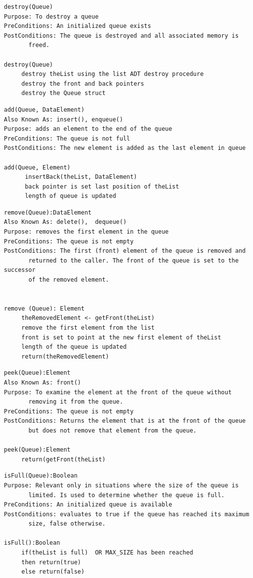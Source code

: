 \begin{lstlisting}
destroy(Queue)
Purpose: To destroy a queue
PreConditions: An initialized queue exists
PostConditions: The queue is destroyed and all associated memory is 
       freed.

destroy(Queue)
     destroy theList using the list ADT destroy procedure
     destroy the front and back pointers
     destroy the Queue struct
\end{lstlisting}

   

\begin{lstlisting}
add(Queue, DataElement)
Also Known As: insert(), enqueue()
Purpose: adds an element to the end of the queue
PreConditions: The queue is not full
PostConditions: The new element is added as the last element in queue

add(Queue, Element)
      insertBack(theList, DataElement)
      back pointer is set last position of theList
      length of queue is updated
\end{lstlisting}


\begin{lstlisting}
remove(Queue):DataElement
Also Known As: delete(),  dequeue()
Purpose: removes the first element in the queue
PreConditions: The queue is not empty
PostConditions: The first (front) element of the queue is removed and 
       returned to the caller. The front of the queue is set to the successor 
       of the removed element.


remove (Queue): Element
     theRemovedElement <- getFront(theList)
     remove the first element from the list
     front is set to point at the new first element of theList
     length of the queue is updated
     return(theRemovedElement)
\end{lstlisting}





\begin{lstlisting}
peek(Queue):Element
Also Known As: front()
Purpose: To examine the element at the front of the queue without 
       removing it from the queue.
PreConditions: The queue is not empty
PostConditions: Returns the element that is at the front of the queue 
       but does not remove that element from the queue.

peek(Queue):Element
     return(getFront(theList)
\end{lstlisting}




\begin{lstlisting}
isFull(Queue):Boolean
Purpose: Relevant only in situations where the size of the queue is 
       limited. Is used to determine whether the queue is full.
PreConditions: An initialized queue is available
PostConditions: evaluates to true if the queue has reached its maximum 
       size, false otherwise.
       
isFull():Boolean
     if(theList is full)  OR MAX_SIZE has been reached
     then return(true)
     else return(false)
\end{lstlisting}

